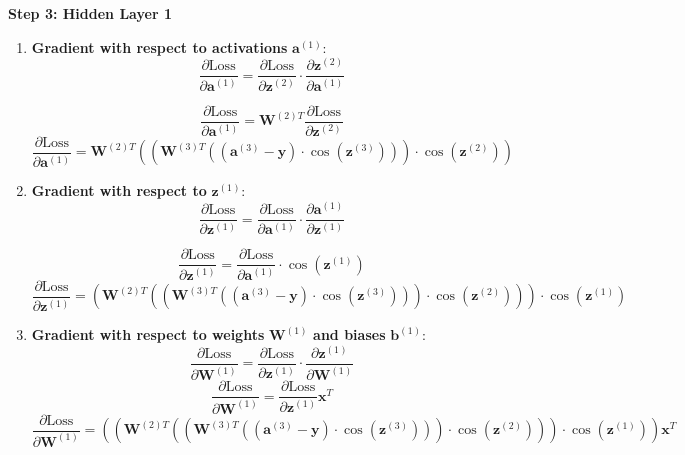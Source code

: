\documentclass{ioereport}
\begin{document}
\textbf{Step 3: Hidden Layer 1}
\begin{enumerate}[label=\textbf{\roman*.}]
  \item \textbf{Gradient with respect to activations} $\mathbf{a}^{(1)}$:
      \[
  \frac{\partial \text{Loss}}{\partial \mathbf{a}^{(1)}} = \frac{\partial \text{Loss}}{\partial \mathbf{z}^{(2)}} \cdot \frac{\partial \mathbf{z}^{(2)}}{\partial \mathbf{a}^{(1)}}
  \]
  
  \[
  \frac{\partial \text{Loss}}{\partial \mathbf{a}^{(1)}} = \mathbf{W}^{(2)T} \frac{\partial \text{Loss}}{\partial \mathbf{z}^{(2)}}
  \]
  \begin{equation}
  \frac{\partial \text{Loss}}{\partial \mathbf{a}^{(1)}} = \mathbf{W}^{(2)T} \left(\left(\mathbf{W}^{(3)T} \left((\mathbf{a}^{(3)} - \mathbf{y}) \cdot \cos(\mathbf{z}^{(3)})\right)\right) \cdot \cos(\mathbf{z}^{(2)})\right)
  \end{equation}

  \item \textbf{Gradient with respect to} $\mathbf{z}^{(1)}$:
    \[
  \frac{\partial \text{Loss}}{\partial \mathbf{z}^{(1)}} = \frac{\partial \text{Loss}}{\partial \mathbf{a}^{(1)}} \cdot \frac{\partial \mathbf{a}^{(1)}}{\partial \mathbf{z}^{(1)}}
  \]

  \[
  \frac{\partial \text{Loss}}{\partial \mathbf{z}^{(1)}} = \frac{\partial \text{Loss}}{\partial \mathbf{a}^{(1)}} \cdot \cos(\mathbf{z}^{(1)})
  \]
  \begin{equation}
  \frac{\partial \text{Loss}}{\partial \mathbf{z}^{(1)}} = \left(\mathbf{W}^{(2)T} \left(\left(\mathbf{W}^{(3)T} \left((\mathbf{a}^{(3)} - \mathbf{y}) \cdot \cos(\mathbf{z}^{(3)})\right)\right) \cdot \cos(\mathbf{z}^{(2)})\right)\right) \cdot \cos(\mathbf{z}^{(1)})
  \end{equation}

  \item \textbf{Gradient with respect to weights} $\mathbf{W}^{(1)}$ \textbf{and biases} $\mathbf{b}^{(1)}$:
       \[
  \frac{\partial \text{Loss}}{\partial \mathbf{W}^{(1)}} = \frac{\partial \text{Loss}}{\partial \mathbf{z}^{(1)}} \cdot \frac{\partial \mathbf{z}^{(1)}}{\partial \mathbf{W}^{(1)}}
  \]
  \[
  \frac{\partial \text{Loss}}{\partial \mathbf{W}^{(1)}} = \frac{\partial \text{Loss}}{\partial \mathbf{z}^{(1)}} \mathbf{x}^T
  \]
  \begin{equation}
  \frac{\partial \text{Loss}}{\partial \mathbf{W}^{(1)}} = \left(\left(\mathbf{W}^{(2)T} \left(\left(\mathbf{W}^{(3)T} \left((\mathbf{a}^{(3)} - \mathbf{y}) \cdot \cos(\mathbf{z}^{(3)})\right)\right) \cdot \cos(\mathbf{z}^{(2)})\right)\right) \cdot \cos(\mathbf{z}^{(1)})\right) \mathbf{x}^T
  \end{equation}


\end{enumerate}
\end{document}
